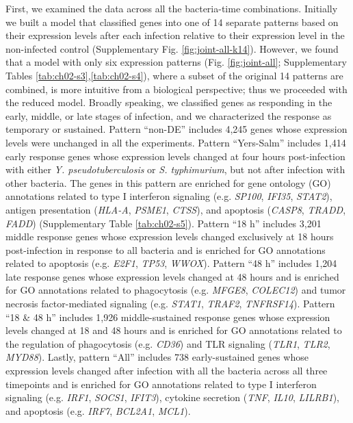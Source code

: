 First, we examined the data across all the bacteria-time combinations.
Initially we built a model that classified genes into one of 14 separate
patterns based on their expression levels after each infection relative
to their expression level in the non-infected control (Supplementary
Fig. \ref{fig:joint-all-k14}). However, we found that a model with only six expression
patterns (Fig. \ref{fig:joint-all}; Supplementary Tables \ref{tab:ch02-s3},\ref{tab:ch02-s4}), where a subset of the
original 14 patterns are combined, is more intuitive from a biological
perspective; thus we proceeded with the reduced model. Broadly speaking,
we classified genes as responding in the early, middle, or late stages
of infection, and we characterized the response as temporary or
sustained. Pattern ``non-DE'' includes 4,245 genes whose expression
levels were unchanged in all the experiments. Pattern ``Yers-Salm''
includes 1,414 early response genes whose expression levels changed at
four hours post-infection with either \emph{Y. pseudotuberculosis} or
\emph{S. typhimurium}, but not after infection with other bacteria. The
genes in this pattern are enriched for gene ontology (GO) annotations
related to type I interferon signaling (e.g. \emph{SP100}, \emph{IFI35},
\emph{STAT2}), antigen presentation (\emph{HLA-A}, \emph{PSME1},
\emph{CTSS}), and apoptosis (\emph{CASP8}, \emph{TRADD}, \emph{FADD})
(Supplementary Table \ref{tab:ch02-s5}). Pattern ``18 h'' includes 3,201 middle
response genes whose expression levels changed exclusively at 18 hours
post-infection in response to all bacteria and is enriched for GO
annotations related to apoptosis (e.g. \emph{E2F1}, \emph{TP53},
\emph{WWOX}). Pattern ``48 h'' includes 1,204 late response genes whose
expression levels changed at 48 hours and is enriched for GO annotations
related to phagocytosis (e.g. \emph{MFGE8}, \emph{COLEC12}) and tumor
necrosis factor-mediated signaling (e.g. \emph{STAT1}, \emph{TRAF2},
\emph{TNFRSF14}). Pattern ``18 \& 48 h'' includes 1,926 middle-sustained
response genes whose expression levels changed at 18 and 48 hours and is
enriched for GO annotations related to the regulation of phagocytosis
(e.g. \emph{CD36}) and TLR signaling (\emph{TLR1}, \emph{TLR2},
\emph{MYD88}). Lastly, pattern ``All'' includes 738 early-sustained
genes whose expression levels changed after infection with all the
bacteria across all three timepoints and is enriched for GO annotations
related to type I interferon signaling (e.g. \emph{IRF1}, \emph{SOCS1},
\emph{IFIT3}), cytokine secretion (\emph{TNF}, \emph{IL10},
\emph{LILRB1}), and apoptosis (e.g. \emph{IRF7}, \emph{BCL2A1},
\emph{MCL1}).

